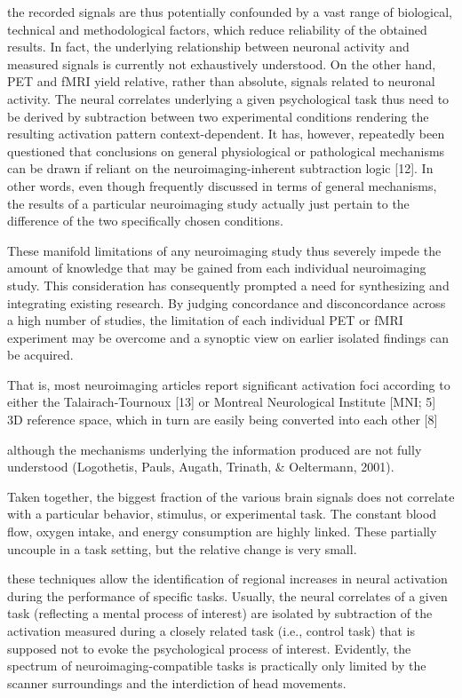 \documentclass[authoryear,review,3p]{elsarticle}
\begin{document}
the recorded signals are thus potentially confounded by a vast range of biological, technical and methodological factors, which reduce reliability of the obtained results. In fact, the underlying relationship between neuronal activity and measured signals is currently not exhaustively understood. On the other hand, PET and fMRI yield relative, rather than absolute, signals related to neuronal activity. The neural correlates underlying a given psychological task thus need to be derived by subtraction between two experimental conditions rendering the resulting activation pattern context-dependent. It has, however, repeatedly been questioned that conclusions on general physiological or pathological mechanisms can be drawn if reliant on the neuroimaging-inherent subtraction logic [12]. In other words, even though frequently discussed in terms of general mechanisms, the results of a particular neuroimaging study actually just pertain to the difference of the two specifically chosen conditions.

These manifold limitations of any neuroimaging study thus severely impede the amount of knowledge that may be gained from each individual neuroimaging study. This consideration has consequently prompted a need for synthesizing and integrating existing research. By judging concordance and disconcordance across a high number of studies, the limitation of each individual PET or fMRI experiment may be overcome and a synoptic view on earlier isolated findings can be acquired. 

That is, most neuroimaging articles report significant activation foci according to either the Talairach-Tournoux [13] or Montreal Neurological Institute [MNI; 5] 3D reference space, which in turn are easily being converted into each other [8]

although the mechanisms underlying the information produced are not fully understood (Logothetis, Pauls, Augath, Trinath, & Oeltermann, 2001).


Taken together, the biggest fraction of the various brain signals does not correlate with a particular behavior, stimulus, or experimental task. The constant blood flow, oxygen intake, and energy consumption are highly linked. These partially uncouple in a task setting, but the relative change is very small.

these techniques allow the identification of regional increases in neural activation during the performance of specific tasks. Usually, the neural correlates of a given task (reflecting a mental process of interest) are isolated by subtraction of the activation measured during a closely related task (i.e., control task) that is supposed not to evoke the psychological process of interest. Evidently, the spectrum of neuroimaging-compatible tasks is practically only limited by the scanner surroundings and the interdiction of head movements.
\end{document}
